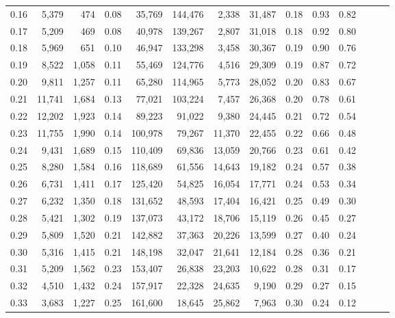 \begin{tabular}{rrrrrrrrrrrrrr}
0.16 &   5,379 &    474 &  0.08 &   35,769 &  144,476 &   2,338 &  31,487 &  0.18 &  0.93 &      0.82 \\
0.17 &   5,209 &    469 &  0.08 &   40,978 &  139,267 &   2,807 &  31,018 &  0.18 &  0.92 &      0.80 \\
0.18 &   5,969 &    651 &  0.10 &   46,947 &  133,298 &   3,458 &  30,367 &  0.19 &  0.90 &      0.76 \\
0.19 &   8,522 &  1,058 &  0.11 &   55,469 &  124,776 &   4,516 &  29,309 &  0.19 &  0.87 &      0.72 \\
0.20 &   9,811 &  1,257 &  0.11 &   65,280 &  114,965 &   5,773 &  28,052 &  0.20 &  0.83 &      0.67 \\
0.21 &  11,741 &  1,684 &  0.13 &   77,021 &  103,224 &   7,457 &  26,368 &  0.20 &  0.78 &      0.61 \\
0.22 &  12,202 &  1,923 &  0.14 &   89,223 &   91,022 &   9,380 &  24,445 &  0.21 &  0.72 &      0.54 \\
0.23 &  11,755 &  1,990 &  0.14 &  100,978 &   79,267 &  11,370 &  22,455 &  0.22 &  0.66 &      0.48 \\
0.24 &   9,431 &  1,689 &  0.15 &  110,409 &   69,836 &  13,059 &  20,766 &  0.23 &  0.61 &      0.42 \\
0.25 &   8,280 &  1,584 &  0.16 &  118,689 &   61,556 &  14,643 &  19,182 &  0.24 &  0.57 &      0.38 \\
0.26 &   6,731 &  1,411 &  0.17 &  125,420 &   54,825 &  16,054 &  17,771 &  0.24 &  0.53 &      0.34 \\
0.27 &   6,232 &  1,350 &  0.18 &  131,652 &   48,593 &  17,404 &  16,421 &  0.25 &  0.49 &      0.30 \\
0.28 &   5,421 &  1,302 &  0.19 &  137,073 &   43,172 &  18,706 &  15,119 &  0.26 &  0.45 &      0.27 \\
0.29 &   5,809 &  1,520 &  0.21 &  142,882 &   37,363 &  20,226 &  13,599 &  0.27 &  0.40 &      0.24 \\
0.30 &   5,316 &  1,415 &  0.21 &  148,198 &   32,047 &  21,641 &  12,184 &  0.28 &  0.36 &      0.21 \\
0.31 &   5,209 &  1,562 &  0.23 &  153,407 &   26,838 &  23,203 &  10,622 &  0.28 &  0.31 &      0.17 \\
0.32 &   4,510 &  1,432 &  0.24 &  157,917 &   22,328 &  24,635 &   9,190 &  0.29 &  0.27 &      0.15 \\
0.33 &   3,683 &  1,227 &  0.25 &  161,600 &   18,645 &  25,862 &   7,963 &  0.30 &  0.24 &      0.12 \\

\end{tabular}
